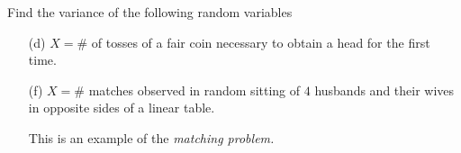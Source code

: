 \begin{problem}[Handout 7, \# 6(d, f)]
  Find the variance of the following random variables
  \begin{itemize}[noitemsep]
  \item[(d)] \(X=\#\) of tosses of a fair coin necessary to obtain a head
    for the first time.
  \item[(f)] \(X=\#\) matches observed in random sitting of \(4\) husbands
    and their wives in opposite sides of a linear table.

    This is an example of the \emph{matching problem.}
  \end{itemize}
\end{problem}
\begin{solution}

\end{solution}
\newpage

